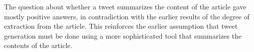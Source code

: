 The question about whether a tweet summarizes the content of the article gave mostly positive answers, in contradiction with the earlier results of the degree of extraction from the article. This reinforces the earlier assumption that tweet generation must be done using a more sophisticated tool that summarizes the contents of the article.



